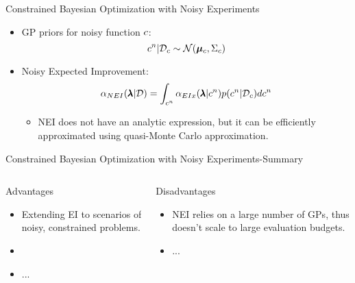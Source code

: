 \begin{frame}{Constrained Bayesian Optimization with Noisy Experiments}
\begin{itemize}
    \item GP priors for noisy function $c$:
    \begin{equation*}
        c^{n}|\mathcal{D}_{c} \sim \mathcal{N}(\boldsymbol{\mu}_{c},\Sigma_{c})
    \end{equation*}
    \item Noisy Expected Improvement:
    \begin{equation*}
        \alpha_{NEI}(\pmb{\lambda}|\mathcal{D})=\int_{c^{n}}\alpha_{EIx}(\pmb{\lambda}|c^{n})p(c^{n}|\mathcal{D}_{c})dc^{n}
    \end{equation*}
    \begin{itemize}
        \item NEI does not have an analytic expression, but it can be efficiently approximated using quasi-Monte Carlo approximation.
    \end{itemize}
\end{itemize}
    
\end{frame}

\begin{frame}{Constrained Bayesian Optimization with Noisy Experiments-Summary}
\begin{columns}[T] %
\begin{column}{.48\textwidth}
    \begin{block}{Advantages}
    \begin{itemize}
    	\item Extending EI to scenarios of noisy, constrained problems.
    	\pause
    	\item 
    	\pause
    	\item ... 
    \end{itemize}
    \end{block}
\pause
\end{column}%

\hfill%

\begin{column}{.48\textwidth}

    \begin{block}{Disadvantages}
    \begin{itemize}
    	\item NEI relies on a large number of GPs, thus doesn't scale to large evaluation budgets.
    	\pause
    	\item ...
    \end{itemize}
\end{block}

\end{column}
\end{columns}   
\end{frame}

